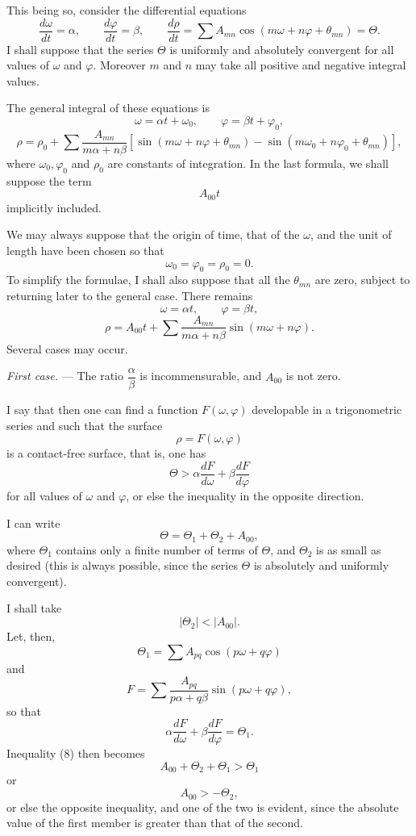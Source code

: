 \documentclass[11pt]{article}
\begin{document}
This being so, consider the differential equations
\[
\frac{d\omega}{dt}=\alpha,
\qquad
\frac{d\varphi}{dt}=\beta,
\qquad
\frac{d\rho}{dt}=\sum A_{mn}\cos(m\omega+n\varphi+\theta_{mn})=\Theta.
\]
I shall suppose that the series $\Theta$ is uniformly and absolutely convergent for all values of $\omega$ and $\varphi$. Moreover $m$ and $n$ may take all positive and negative integral values.

The general integral of these equations is
\[
\omega=\alpha t+\omega_0,
\qquad
\varphi=\beta t+\varphi_0,
\]
\[
\rho=\rho_0+\sum \frac{A_{mn}}{m\alpha+n\beta}\left[\sin(m\omega+n\varphi+\theta_{mn})-\sin(m\omega_0+n\varphi_0+\theta_{mn})\right],
\]
where $\omega_0,\varphi_0$ and $\rho_0$ are constants of integration. In the last formula, we shall suppose the term
\[
A_{00}t
\]
implicitly included.

We may always suppose that the origin of time, that of the $\omega$, and the unit of length have been chosen so that
\[
\omega_0=\varphi_0=\rho_0=0.
\]
To simplify the formulae, I shall also suppose that all the $\theta_{mn}$ are zero, subject to returning later to the general case. There remains
\[
\omega=\alpha t,
\qquad
\varphi=\beta t,
\]
\[
\rho=A_{00}t+\sum \frac{A_{mn}}{m\alpha+n\beta}\sin(m\omega+n\varphi).
\]
Several cases may occur.

\emph{First case.} — The ratio $\dfrac{\alpha}{\beta}$ is incommensurable, and $A_{00}$ is not zero.

I say that then one can find a function $F(\omega,\varphi)$ developable in a trigonometric series and such that the surface
\[
\rho=F(\omega,\varphi)
\]
is a contact-free surface, that is, one has
\begin{equation}
\Theta>\alpha\frac{dF}{d\omega}+\beta\frac{dF}{d\varphi}
\tag{8}
\end{equation}
for all values of $\omega$ and $\varphi$, or else the inequality in the opposite direction.

I can write
\[
\Theta=\Theta_1+\Theta_2+A_{00},
\]
where $\Theta_1$ contains only a finite number of terms of $\Theta$, and $\Theta_2$ is as small as desired (this is always possible, since the series $\Theta$ is absolutely and uniformly convergent).

I shall take
\[
|\Theta_2|<|A_{00}|.
\]
Let, then,
\[
\Theta_1=\sum A_{pq}\cos(p\omega+q\varphi)
\]
and
\[
F=\sum \frac{A_{pq}}{p\alpha+q\beta}\sin(p\omega+q\varphi),
\]
so that
\[
\alpha\frac{dF}{d\omega}+\beta\frac{dF}{d\varphi}=\Theta_1.
\]
Inequality (8) then becomes
\[
A_{00}+\Theta_2+\Theta_1>\Theta_1
\]
or
\[
A_{00}>-\Theta_2,
\]
or else the opposite inequality, and one of the two is evident, since the absolute value of the first member is greater than that of the second.
\end{document}
